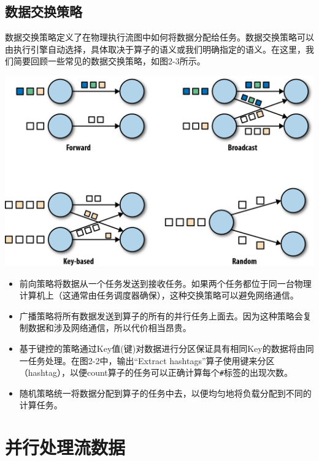 \documentclass[cn,11pt,chinese]{elegantbook}
\providecommand{\tightlist}{%
  \setlength{\itemsep}{0pt}\setlength{\parskip}{0pt}}
\begin{document}
\hypertarget{ux6570ux636eux4ea4ux6362ux7b56ux7565}{%
\subsection{数据交换策略}\label{ux6570ux636eux4ea4ux6362ux7b56ux7565}}

数据交换策略定义了在物理执行流图中如何将数据分配给任务。数据交换策略可以由执行引擎自动选择，具体取决于算子的语义或我们明确指定的语义。在这里，我们简要回顾一些常见的数据交换策略，如图2-3所示。

\includegraphics{images/spaf_0203.png}

\begin{itemize}
\tightlist
\item
  前向策略将数据从一个任务发送到接收任务。如果两个任务都位于同一台物理计算机上（这通常由任务调度器确保），这种交换策略可以避免网络通信。
\item
  广播策略将所有数据发送到算子的所有的并行任务上面去。因为这种策略会复制数据和涉及网络通信，所以代价相当昂贵。
\item
  基于键控的策略通过Key值(键)对数据进行分区保证具有相同Key的数据将由同一任务处理。在图2-2中，输出``Extract
  hashtags''算子使用键来分区（hashtag），以便count算子的任务可以正确计算每个\texttt{\#}标签的出现次数。
\item
  随机策略统一将数据分配到算子的任务中去，以便均匀地将负载分配到不同的计算任务。
\end{itemize}

\hypertarget{ux5e76ux884cux5904ux7406ux6d41ux6570ux636e}{%
\section{并行处理流数据}\label{ux5e76ux884cux5904ux7406ux6d41ux6570ux636e}}
\end{document}
